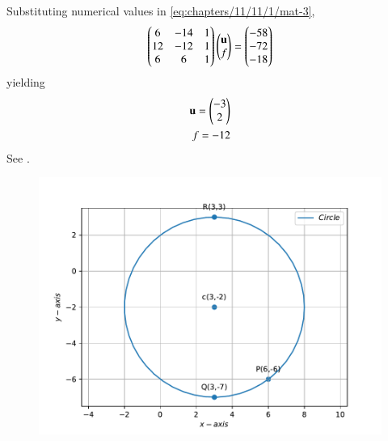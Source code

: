 Substituting numerical values in 
	\eqref{eq:chapters/11/11/1/mat-3},
\begin{align}
 \begin{pmatrix}6 & -14 & 1 \\
	12 & -12 & 1 \\
	6 & 6 & 1
	\end{pmatrix} \begin{pmatrix}\mathbf{u} \\
	           f 
		\end{pmatrix}  = \begin{pmatrix}-58 \\ -72 \\ -18 \end{pmatrix}
\end{align}
yielding
\begin{align}
	\mathbf{u} = \begin{pmatrix}-3 \\ 2\end{pmatrix} \\ 
	f = -12 
\end{align}
See .
\begin{figure}[!h]
	\begin{center}
		\includegraphics[width=\columnwidth]{chapters/10/7/4/3/figs/problem3.pdf}
	\end{center}
\caption{}
\label{fig:10/7/4/3Fig1}
\end{figure}
